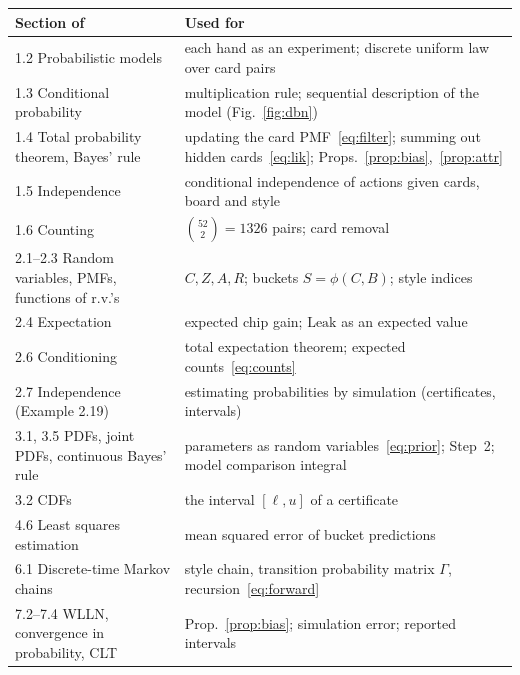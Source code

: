 \documentclass[11pt,a4paper]{article}
\newcommand{\C}{C}            %
\newcommand{\Sb}{S}           %
\newcommand{\Z}{Z}            %
\newcommand{\A}{A}            %
\newcommand{\B}{B}            %
\newcommand{\R}{R}            %
\newcommand{\1}{\mathbf{1}}
\begin{document}
\begin{center}\small
\begin{tabular}{@{}p{5.6cm}p{9.8cm}@{}}
\toprule
Section of~\cite{bertsekas2000} & Used for\\
\midrule
1.2 Probabilistic models & each hand as an experiment; discrete uniform law over card pairs\\
1.3 Conditional probability & multiplication rule; sequential description of the model (Fig.~\ref{fig:dbn})\\
1.4 Total probability theorem, Bayes' rule & updating the card PMF~\eqref{eq:filter}; summing out hidden cards~\eqref{eq:lik}; Props.~\ref{prop:bias},~\ref{prop:attr}\\
1.5 Independence & conditional independence of actions given cards, board and style\\
1.6 Counting & $\binom{52}{2}=1326$ pairs; card removal\\
2.1--2.3 Random variables, PMFs, functions of r.v.'s & $\C,\Z,\A,\R$; buckets $\Sb=\phi(\C,\B)$; style indices\\
2.4 Expectation & expected chip gain; $\text{Leak}$ as an expected value\\
2.6 Conditioning & total expectation theorem; expected counts~\eqref{eq:counts}\\
2.7 Independence (Example 2.19) & estimating probabilities by simulation (certificates, intervals)\\
3.1, 3.5 PDFs, joint PDFs, continuous Bayes' rule & parameters as random variables~\eqref{eq:prior}; Step~2; model comparison integral\\
3.2 CDFs & the interval $[\ell,u]$ of a certificate\\
4.6 Least squares estimation & mean squared error of bucket predictions\\
6.1 Discrete-time Markov chains & style chain, transition probability matrix $\Gamma$, recursion~\eqref{eq:forward}\\
7.2--7.4 WLLN, convergence in probability, CLT & Prop.~\ref{prop:bias}; simulation error; reported intervals\\
\bottomrule
\end{tabular}
\end{center}



\end{document}
